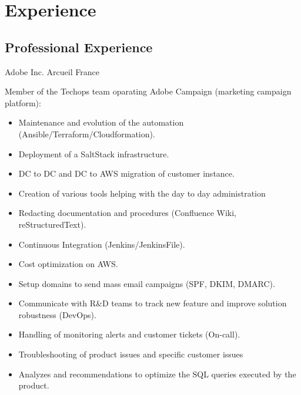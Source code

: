 \documentclass[10pt,a4paper,sans]{moderncv}        %
\begin{document}
\section{Experience}

\subsection{Professional Experience}
              {Adobe Inc.}
              {Arcueil}
              {France}
              {Member of the Techops team oparating Adobe Campaign (marketing campaign platform):
                 \begin{itemize}
                 \item Maintenance and evolution of the automation (Ansible/Terraform/Cloudformation).
                 \item Deployment of a SaltStack infrastructure.
                 \item DC to DC and DC to AWS migration of customer instance.
                 \item Creation of various tools helping with the day to day administration
                 \item Redacting documentation and procedures (Confluence Wiki, reStructuredText).
                 \item Continuous Integration (Jenkins/JenkinsFile).
                 \item Cost optimization on AWS.
		 \item Setup domains to send mass email campaigns (SPF, DKIM, DMARC).
                 \item Communicate with R\&D teams to track new feature and improve solution robustness (DevOps).
		 \item Handling of monitoring alerts and customer tickets (On-call).
                 \item Troubleshooting of product issues and specific customer issues
                 \item Analyzes and recommendations to optimize the SQL queries executed by the product.
                 \end{itemize}
              }
\end{document}
